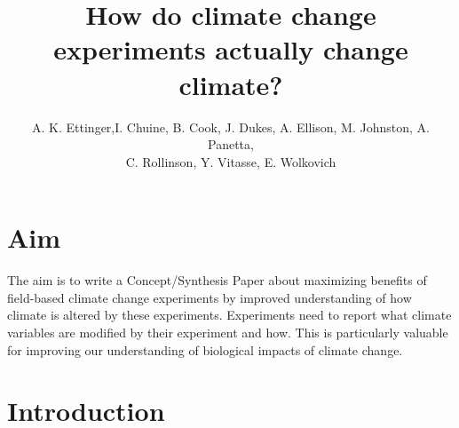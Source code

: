 \documentclass{article}
\begin{document}
% 
\title{How do climate change experiments actually change climate?} %
\author{A. K. Ettinger,I. Chuine, B. Cook, J. Dukes, A. Ellison, M. Johnston, A. Panetta,\\ C. Rollinson, Y. Vitasse, E. Wolkovich}
\maketitle  %

\section {Aim}

The aim is to write a Concept/Synthesis Paper about maximizing benefits of field-based climate change experiments by improved understanding of how climate is altered by these experiments. Experiments need to report what climate variables are modified by their experiment and how. This is particularly valuable for improving our understanding of biological impacts of climate change.

\section {Introduction}
\end{document}
